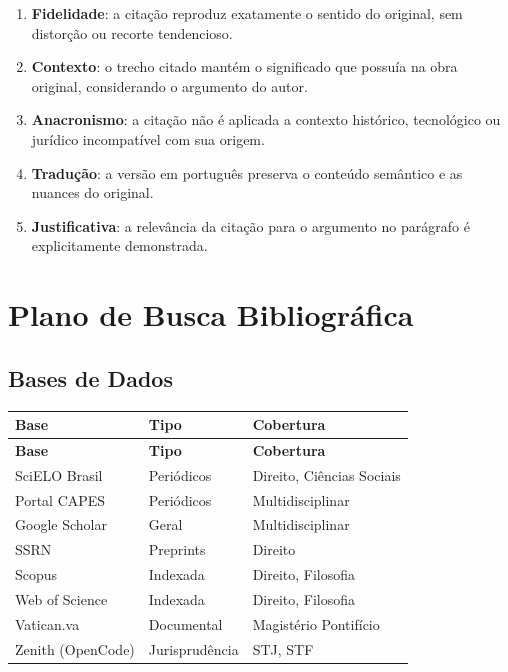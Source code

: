 \documentclass[12pt,a4paper]{article}
\begin{document}
\begin{enumerate}[label=A\arabic*.]
\item \textbf{Fidelidade}: a citação reproduz exatamente o sentido do original, sem distorção ou recorte tendencioso.
\item \textbf{Contexto}: o trecho citado mantém o significado que possuía na obra original, considerando o argumento do autor.
\item \textbf{Anacronismo}: a citação não é aplicada a contexto histórico, tecnológico ou jurídico incompatível com sua origem.
\item \textbf{Tradução}: a versão em português preserva o conteúdo semântico e as nuances do original.
\item \textbf{Justificativa}: a relevância da citação para o argumento no parágrafo é explicitamente demonstrada.
\end{enumerate}

\section{Plano de Busca Bibliográfica}

\subsection{Bases de Dados}

\medskip
{\small
\begin{longtable}{|p{4.5cm}|p{3.5cm}|p{5.5cm}|}
\hline
\rowcolor[gray]{0.9}
\textbf{Base} & \textbf{Tipo} & \textbf{Cobertura} \\
\hline
\endfirsthead
\hline
\rowcolor[gray]{0.9}
\textbf{Base} & \textbf{Tipo} & \textbf{Cobertura} \\
\hline
\endhead
SciELO Brasil & Periódicos & Direito, Ciências Sociais \\
\hline
Portal CAPES & Periódicos & Multidisciplinar \\
\hline
Google Scholar & Geral & Multidisciplinar \\
\hline
SSRN & Preprints & Direito \\
\hline
Scopus & Indexada & Direito, Filosofia \\
\hline
Web of Science & Indexada & Direito, Filosofia \\
\hline
Vatican.va & Documental & Magistério Pontifício \\
\hline
Zenith (OpenCode) & Jurisprudência & STJ, STF \\
\hline
\end{longtable}
}
\end{document}
